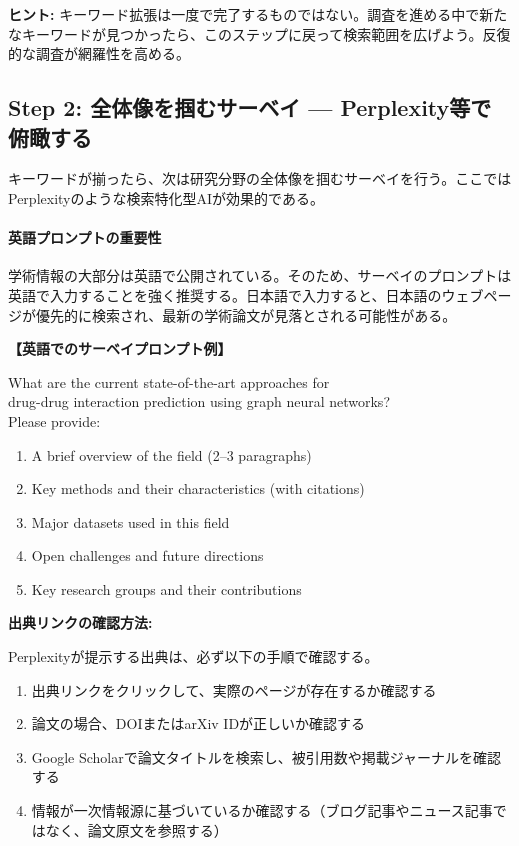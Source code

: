 \begin{screen}
\textbf{ヒント:} キーワード拡張は一度で完了するものではない。調査を進める中で新たなキーワードが見つかったら、このステップに戻って検索範囲を広げよう。反復的な調査が網羅性を高める。
\end{screen}

\subsection{Step 2: 全体像を掴むサーベイ --- Perplexity等で俯瞰する}

キーワードが揃ったら、次は研究分野の全体像を掴むサーベイを行う。ここではPerplexityのような検索特化型AIが効果的である。

\paragraph{英語プロンプトの重要性}
学術情報の大部分は英語で公開されている。そのため、サーベイのプロンプトは英語で入力することを強く推奨する。日本語で入力すると、日本語のウェブページが優先的に検索され、最新の学術論文が見落とされる可能性がある。

\begin{promptbox}
\textbf{【英語でのサーベイプロンプト例】}

What are the current state-of-the-art approaches for\\
drug-drug interaction prediction using graph neural networks?\\
Please provide:

\begin{enumerate}
\item A brief overview of the field (2--3 paragraphs)
\item Key methods and their characteristics (with citations)
\item Major datasets used in this field
\item Open challenges and future directions
\item Key research groups and their contributions
\end{enumerate}
\end{promptbox}

\textbf{出典リンクの確認方法:}

Perplexityが提示する出典は、必ず以下の手順で確認する。

\begin{enumerate}
\item 出典リンクをクリックして、実際のページが存在するか確認する
\item 論文の場合、DOIまたはarXiv IDが正しいか確認する
\item Google Scholarで論文タイトルを検索し、被引用数や掲載ジャーナルを確認する
\item 情報が一次情報源に基づいているか確認する（ブログ記事やニュース記事ではなく、論文原文を参照する）
\end{enumerate}

